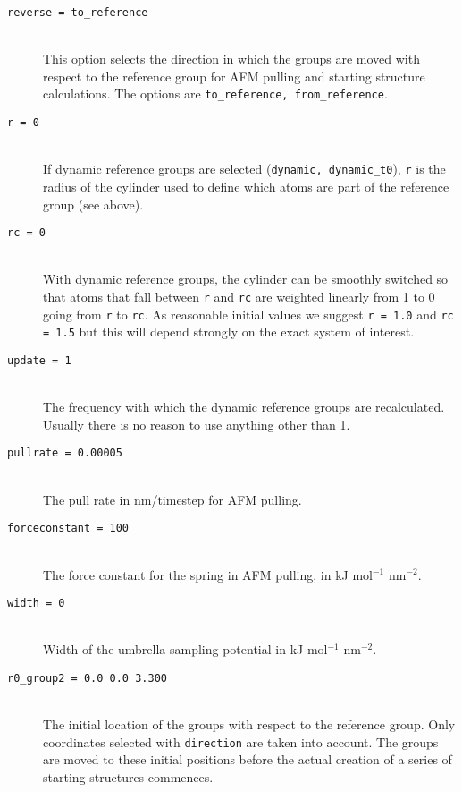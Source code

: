 \begin{description}
\item[\tt reverse                  = to\_reference]\mbox{}\\
This option selects the direction in which the groups are moved with
respect to the reference group for AFM pulling and starting structure
calculations. The options are {\tt to\_reference, from\_reference}.

\item[\tt r                        = 0]\mbox{}\\
If dynamic reference groups are selected ({\tt dynamic, dynamic\_t0}),
{\tt r} is the radius of the cylinder used to define which atoms are
part of the reference group (see above).

\item[\tt rc                       = 0]\mbox{}\\
With dynamic reference groups, the cylinder can be smoothly switched
so that atoms that fall between {\tt r} and {\tt rc} are weighted
linearly from 1 to 0 going from {\tt r} to {\tt rc}. As reasonable
initial values we suggest {\tt r = 1.0} and {\tt rc = 1.5} but this
will depend strongly on the exact system of interest.

\item[\tt update                   = 1]\mbox{}\\
The frequency with which the dynamic reference groups are
recalculated. Usually there is no reason to use anything other than 1.

\item[\tt pullrate                 = 0.00005]\mbox{}\\
The pull rate in nm/timestep for AFM pulling.

\item[\tt forceconstant            = 100]\mbox{}\\
The force constant for the spring in AFM pulling, in kJ mol$^{-1}$
nm$^{-2}$.

\item[\tt width                    = 0]\mbox{}\\
Width of the umbrella sampling potential in kJ mol$^{-1}$ nm$^{-2}$. 

\item[\tt r0\_group2                = 0.0  0.0   3.300]\mbox{}\\
The initial location of the groups with respect to the reference
group. Only coordinates selected with {\tt direction} are taken into account.
The groups are moved to these initial positions before the
actual creation of a series of starting structures commences.


\end{description}
